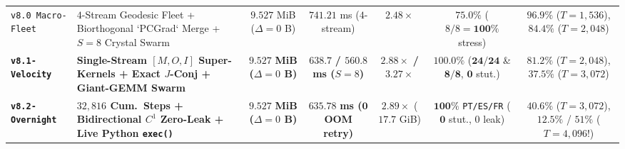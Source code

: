 \documentclass[10pt,twocolumn]{article}
\begin{document}
\begin{table}[t]
{\begin{tabular}{llccccc}
\texttt{v8.0 Macro-Fleet} & $4$-Stream Geodesic Fleet + Biorthogonal `PCGrad` Merge + $S=8$ Crystal Swarm & $9.527$ MiB ($\Delta=0$ B) & $741.21$ ms ($4$-stream) & $2.48\times$ & $75.0\%$ ($8/8=\mathbf{100\%}$ stress) & $96.9\%$ ($T=1{,}536$), $\mathbf{84.4\%}$ ($T=2{,}048$) \\
\textbf{\texttt{v8.1-Velocity}} & \textbf{Single-Stream $[M,O,I]$ Super-Kernels + Exact $J$-Conj + Giant-GEMM Swarm} & $\mathbf{9.527}$ \textbf{MiB ($\Delta=0$ B)} & $\mathbf{638.7}$ \textbf{/ $\mathbf{560.8}$ ms ($S=8$)} & $\mathbf{2.88\times}$ \textbf{/ $\mathbf{3.27\times}$} & $\mathbf{100.0\%}$ ($\mathbf{24/24}$ \& $\mathbf{8/8}$, $\mathbf{0}$ stut.) & $81.2\%$ ($T=2{,}048$), $37.5\%$ ($T=3{,}072$) \\
\textbf{\texttt{v8.2-Overnight}} & \textbf{$32{,}816$ Cum.\ Steps + Bidirectional $C^1$ Zero-Leak + Live Python \texttt{exec()}} & $\mathbf{9.527}$ \textbf{MiB ($\Delta=0$ B)} & $\mathbf{635.78}$ \textbf{ms ($\mathbf{0}$ OOM retry)} & $\mathbf{2.89\times}$ ($17.7$ GiB) & $\mathbf{100\%}$ \texttt{PT/ES/FR} ($\mathbf{0}$ stut., $0$ leak) & $\mathbf{40.6\%}$ ($T=3{,}072$), $\mathbf{12.5\%}$ / $51\%$ ($T=4{,}096$!) \\
\bottomrule
\end{tabular}%
}
\end{table}
\end{document}
